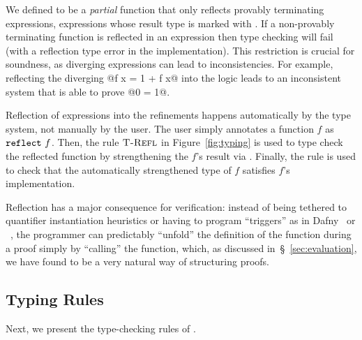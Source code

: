 
We defined \exacttype{\cdot}{\cdot} to be a \textit{partial}
function that only reflects provably terminating expressions,
\ie expressions whose result type is marked with \tlabel.
%
If a non-provably terminating function is reflected
in an \corelan expression then type checking will
fail (with a reflection type error in the implementation).
%
This restriction is crucial for soundness,
as diverging expressions can lead to inconsistencies.
%
For example, reflecting the diverging @f x = 1 + f x@
into the logic leads to an inconsistent system that
is able to prove @0 = 1@.

Reflection of \corelan expressions into the refinements happens
automatically by the type system, not manually by the user.
%
The user simply annotates a function $f$ as $\texttt{reflect}\ f$.
%
Then, the rule $\textsc{T-Refl}$ in Figure~\ref{fig:typing}
is used to type check the reflected function by strengthening
the $f$'s result via \exacttype{\cdot}{\cdot}.
%
Finally, the rule \rtlet is used to check that the
automatically strengthened type of $f$ satisfies $f$'s implementation.


%
Reflection has a major consequence for verification:
%
instead of being tethered to quantifier
instantiation heuristics or having to
program ``triggers'' as in
Dafny~\citep{dafny} or \fstar~\citep{fstar},
%
the programmer can predictably ``unfold'' the
definition of the function during a proof simply
by ``calling'' the function, which, as discussed
in~\S~\ref{sec:evaluation}, we have found to be
a very natural way of structuring proofs.




\subsection{Typing Rules}

%
Next, we present the type-checking rules of \corelan.

